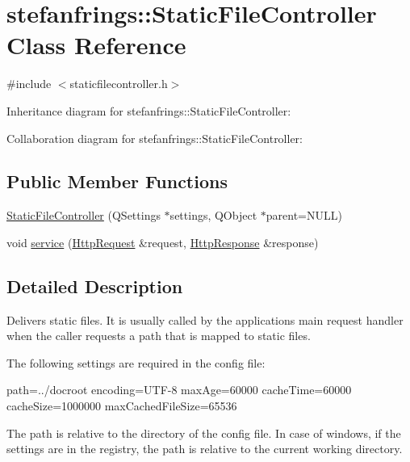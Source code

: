 \hypertarget{classstefanfrings_1_1_static_file_controller}{}\section{stefanfrings\+:\+:Static\+File\+Controller Class Reference}
\label{classstefanfrings_1_1_static_file_controller}


{\ttfamily \#include $<$staticfilecontroller.\+h$>$}



Inheritance diagram for stefanfrings\+:\+:Static\+File\+Controller\+:


Collaboration diagram for stefanfrings\+:\+:Static\+File\+Controller\+:
\subsection*{Public Member Functions}
\begin{DoxyCompactItemize}
\item 
\mbox{\hyperlink{classstefanfrings_1_1_static_file_controller_a03e1bb06035e3205ad6ddcc7502a245e}{Static\+File\+Controller}} (Q\+Settings $\ast$settings, Q\+Object $\ast$parent=N\+U\+LL)
\item 
void \mbox{\hyperlink{classstefanfrings_1_1_static_file_controller_a88bbd874c62c8335d0775629b22871a1}{service}} (\mbox{\hyperlink{classstefanfrings_1_1_http_request}{Http\+Request}} \&request, \mbox{\hyperlink{classstefanfrings_1_1_http_response}{Http\+Response}} \&response)
\end{DoxyCompactItemize}


\subsection{Detailed Description}
Delivers static files. It is usually called by the applications main request handler when the caller requests a path that is mapped to static files. 

The following settings are required in the config file\+: {\ttfamily 
\begin{DoxyPre}
path=../docroot
encoding=UTF-8
maxAge=60000
cacheTime=60000
cacheSize=1000000
maxCachedFileSize=65536
\end{DoxyPre}
} The path is relative to the directory of the config file. In case of windows, if the settings are in the registry, the path is relative to the current working directory. 

